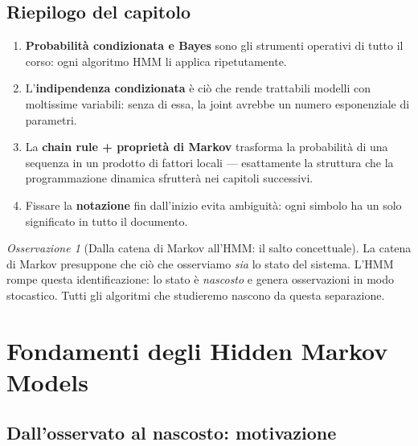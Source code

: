 \documentclass[11pt,a4paper,oneside]{book}
\theoremstyle{plain}
\theoremstyle{definition}
\theoremstyle{remark}
\newtheorem{osservazione}[teorema]{Osservazione}
\begin{document}
\section{Riepilogo del capitolo}

\begin{tcolorbox}[insightbox,title=Takeaway -- Capitolo 1]
\begin{enumerate}[leftmargin=*]
    \item \textbf{Probabilità condizionata e Bayes} sono gli strumenti
          operativi di tutto il corso: ogni algoritmo HMM li applica
          ripetutamente.
    \item L'\textbf{indipendenza condizionata} è ciò che rende
          trattabili modelli con moltissime variabili: senza di essa,
          la joint avrebbe un numero esponenziale di parametri.
    \item La \textbf{chain rule + proprietà di Markov} trasforma la
          probabilità di una sequenza in un prodotto di fattori locali
          --- esattamente la struttura che la programmazione dinamica
          sfrutterà nei capitoli successivi.
    \item Fissare la \textbf{notazione} fin dall'inizio evita
          ambiguità: ogni simbolo ha un solo significato in tutto il
          documento.
\end{enumerate}
\end{tcolorbox}

\begin{osservazione}[Dalla catena di Markov all'HMM: il salto concettuale]
La catena di Markov presuppone che ciò che osserviamo \emph{sia} lo
stato del sistema. L'HMM rompe questa identificazione: lo stato è
\emph{nascosto} e genera osservazioni in modo stocastico. Tutti gli
algoritmi che studieremo nascono da questa separazione.
\end{osservazione}

\chapter{Fondamenti degli Hidden Markov Models}
\label{ch:fondamenti}

\section{Dall'osservato al nascosto: motivazione}
\end{document}
